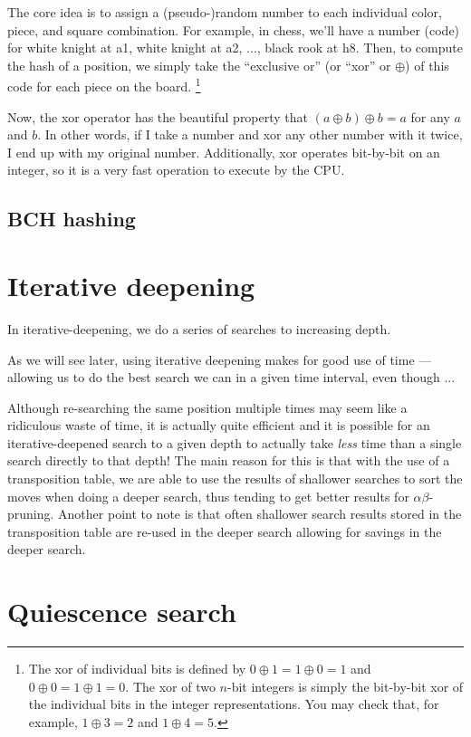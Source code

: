 \documentclass[10pt,dvipdfmx]{report}
\newcommand{\ab}{{$\alpha\beta$}}
\begin{document}
The core idea is to assign a (pseudo-)random number to each individual color, piece, and square
combination.  For example, in chess, we'll have a number (code) for white knight at a1, white knight at a2,
..., black rook at h8.  Then, to compute the hash of a position, we simply take the ``exclusive or''
(or ``xor'' or $\oplus$) of this code for each piece on the board.
\footnote{
  The xor of individual bits is defined by $0\oplus1=1\oplus0=1$ and $0\oplus0=1\oplus1=0$.
  The xor of two $n$-bit integers is simply the bit-by-bit xor of the individual bits in the
  integer representations.  You may check that, for example, $1\oplus3=2$ and $1\oplus4=5$.
}

Now, the xor operator has the beautiful property that $(a\oplus b)\oplus b = a$ for any $a$ and $b$.
In other words, if I take a number and xor any other number with it twice, I end up with my original number.
Additionally, xor operates bit-by-bit on an integer, so it is a very fast operation to execute by the CPU.

\subsection{BCH hashing}

\section{Iterative deepening}

In iterative-deepening, we do a series of searches to increasing depth.

As we will see later, using iterative deepening makes for good use of
time --- allowing us to do the best search we can in a given time interval,
even though ...

Although re-searching the same position multiple times may seem like a ridiculous waste
of time, it is actually quite efficient and it is possible for an iterative-deepened search to
a given depth to actually take {\em less} time than a single search directly to that depth!
The main reason for this is that with the use of a transposition table, we are able to use
the results of shallower searches to sort the moves when doing a deeper search, thus tending to
get better results for \ab-pruning.  Another point to note is that often shallower search results
stored in the transposition table are re-used in the deeper search allowing for savings in the
deeper search.

\section{Quiescence search}
\end{document}
